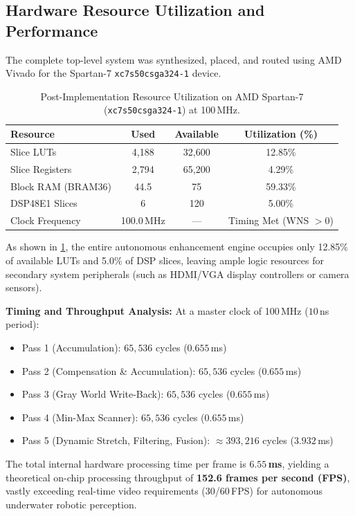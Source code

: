 \documentclass[10pt,twocolumn,letterpaper]{article}
\begin{document}
{\subsection{Hardware Resource Utilization and Performance}
\label{subsec:hardware_utilization}

The complete top-level system was synthesized, placed, and routed using AMD Vivado for the Spartan-7 \texttt{xc7s50csga324-1} device.

\begin{table}[t]
  \centering
  \small
  \caption{Post-Implementation Resource Utilization on AMD Spartan-7 (\texttt{xc7s50csga324-1}) at 100\,MHz.}
  \label{tab:fpga_utilization}
  \begin{tabular}{@{}lccc@{}}
    \toprule
    \textbf{Resource} & \textbf{Used} & \textbf{Available} & \textbf{Utilization (\%)} \\
    \midrule
    Slice LUTs        & 4,188         & 32,600             & 12.85\% \\
    Slice Registers   & 2,794         & 65,200             & 4.29\% \\
    Block RAM (BRAM36)& 44.5          & 75                 & 59.33\% \\
    DSP48E1 Slices    & 6             & 120                & 5.00\% \\
    Clock Frequency   & 100.0\,MHz    & ---                & Timing Met (WNS $> 0$) \\
    \bottomrule
  \end{tabular}
\end{table}

As shown in \cref{tab:fpga_utilization}, the entire autonomous enhancement engine occupies only 12.85\% of available LUTs and 5.0\% of DSP slices, leaving ample logic resources for secondary system peripherals (such as HDMI/VGA display controllers or camera sensors). 

\textbf{Timing and Throughput Analysis:} 
At a master clock of 100\,MHz ($10$\,ns period):
\begin{itemize}
    \item Pass 1 (Accumulation): $65,536$ cycles ($0.655$\,ms)
    \item Pass 2 (Compensation \& Accumulation): $65,536$ cycles ($0.655$\,ms)
    \item Pass 3 (Gray World Write-Back): $65,536$ cycles ($0.655$\,ms)
    \item Pass 4 (Min-Max Scanner): $65,536$ cycles ($0.655$\,ms)
    \item Pass 5 (Dynamic Stretch, Filtering, Fusion): $\approx 393,216$ cycles ($3.932$\,ms)
\end{itemize}
The total internal hardware processing time per frame is \textbf{$6.55$\,ms}, yielding a theoretical on-chip processing throughput of \textbf{152.6 frames per second (FPS)}, vastly exceeding real-time video requirements (30/60\,FPS) for autonomous underwater robotic perception.

} %

\FloatBarrier

{\small


}
\end{document}
